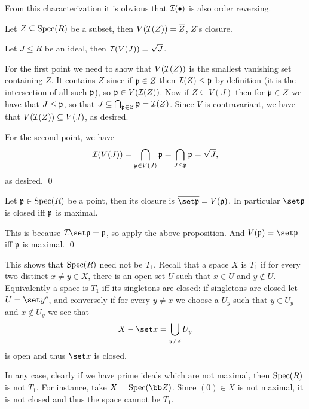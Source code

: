 From this characterization it is obvious that ${\cal I}(\bullet)$ is also order reversing.

\bprop

    \benum
        \item Let $Z\subseteq{\rm Spec}(R)$ be a subset, then $V({\cal I}(Z))={\overline{Z}}$, $Z$'s closure.
        \item Let $J\leq R$ be an ideal, then ${\cal I}(V(J))=\sqrt J$.
    \eenum

\eprop

\bproof

    For the first point we need to show that $V({\cal I}(Z))$ is the smallest vanishing set containing $Z$.
    It contains $Z$ since if ${{\frak p}}\in Z$ then ${\cal I}(Z)\leq{{\frak p}}$ by definition (it is the intersection of all such ${{\frak p}}$), so ${{\frak p}}\in V({\cal I}(Z))$.
    Now if $Z\subseteq V(J)$ then for ${{\frak p}}\in Z$ we have that $J\leq{{\frak p}}$, so that $J\subseteq\bigcap_{{{\frak p}}\in Z}{{\frak p}}={\cal I}(Z)$.
    Since $V$ is contravariant, we have that $V({\cal I}(Z))\subseteq V(J)$, as desired.

    For the second point, we have
    $$ {\cal I}(V(J)) = \bigcap_{{{\frak p}}\in V(J)}{{\frak p}} = \bigcap_{J\leq{{\frak p}}}{{\frak p}} = \sqrt J, $$
    as desired.
    \qed

\eproof

\bcoro

    Let ${{\frak p}}\in{\rm Spec}(R)$ be a point, then its closure is $\cl{\set\p}=V(\p)$.
    In particular $\set\p$ is closed iff ${{\frak p}}$ is maximal.

\ecoro

\bproof

    This is because $\ideal\set\p=\p$, so apply the above proposition.
    And $V(\p)=\set\p$ iff ${{\frak p}}$ is maximal.
    \qed

\eproof

\bexam

    This shows that ${\rm Spec}(R)$ need not be $T_1$.
    Recall that a space $X$ is $T_1$ if for every two distinct $x\neq y\in X$, there is an open set $U$ such that $x\in U$ and $y\notin U$.
    Equivalently a space is $T_1$ iff its singletons are closed: if singletons are closed let $U=\set y^c$, and conversely if for every $y\neq x$ we choose a
    $U_y$ such that $y\in U_y$ and $x\notin U_y$ we see that
    $$ X-\set x = \bigcup_{y\neq x}U_y $$
    is open and thus $\set x$ is closed.

    In any case, clearly if we have prime ideals which are not maximal, then ${\rm Spec}(R)$ is not $T_1$.
    For instance, take $X=\spec(\bZ)$.
    Since $(0)\in X$ is not maximal, it is not closed and thus the space cannot be $T_1$.

